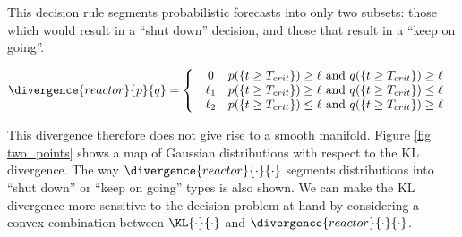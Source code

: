 This decision rule segments probabilistic forecasts into only two subsets: those which would result in a ``shut down'' decision, and those that result in a ``keep on going''. 

\begin{equation}
	\divergence{reactor}{p}{q} = \left\{
	\begin{array}{cc} 
	    \begin{array}{cc}
	      0        & p(\{t\geq T_{crit}\}) \geq \ell \mbox{ and } q(\{t\geq T_{crit}\}) \geq \ell\\
	      \ell_1 & p(\{t\geq T_{crit}\})  \geq \ell \mbox{ and } q(\{t\geq T_{crit}\}) \leq \ell\\
	      \ell_2 & p(\{t\geq T_{crit}\})  \leq \ell \mbox{ and } q(\{t\geq T_{crit}\}) \geq \ell
	    \end{array}
	\end{array}
	\right.
\end{equation}

This divergence therefore does not give rise to a smooth manifold. Figure \ref{fig two_points} shows a map of Gaussian distributions with respect to the KL divergence. The way $\divergence{reactor}{\cdot}{\cdot}$ segments distributions into ``shut down'' or ``keep on going'' types is also shown. We can make the KL divergence more sensitive to the decision problem at hand by considering a convex combination between $\KL{\cdot}{\cdot}$ and $\divergence{reactor}{\cdot}{\cdot}$.